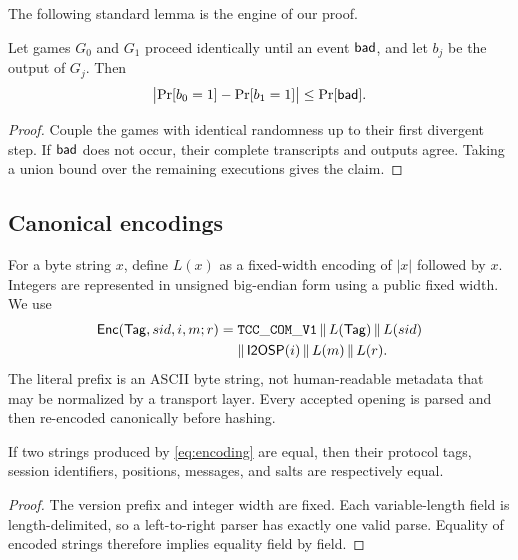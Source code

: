 The following standard lemma is the engine of our proof.

\begin{lemma}
\label{lem:iub}
Let games $G_0$ and $G_1$ proceed identically until an event $\mathsf{bad}$, and let
$b_j$ be the output of $G_j$.  Then
\[
  \bigl|\Pr[b_0=1]-\Pr[b_1=1]\bigr|
  \leq \Pr[\mathsf{bad}].
\]
\end{lemma}

\begin{proof}
Couple the games with identical randomness up to their first divergent step.
If $\mathsf{bad}$ does not occur, their complete transcripts and outputs agree.
Taking a union bound over the remaining executions gives the claim.
\end{proof}

\subsection{Canonical encodings}

For a byte string $x$, define $L(x)$ as a fixed-width encoding of $|x|$
followed by $x$.  Integers are represented in unsigned big-endian form using a
public fixed width.  We use
\begin{align}
 \Encode(\Tag,sid,i,m;r)
   ={}& \mathtt{TCC\char`_COM\char`_V1}\,\|\,L(\Tag)\,\|\,L(sid) \notag\\
      &{}\|\,\mathsf{I2OSP}(i)\,\|\,L(m)\,\|\,L(r).
  \label{eq:encoding}
\end{align}
The literal prefix is an ASCII byte string, not human-readable metadata that
may be normalized by a transport layer.  Every accepted opening is parsed and
then re-encoded canonically before hashing.

\begin{lemma}
\label{lem:context-separation}
If two strings produced by \cref{eq:encoding} are equal, then their protocol
tags, session identifiers, positions, messages, and salts are respectively
equal.
\end{lemma}

\begin{proof}
The version prefix and integer width are fixed.  Each variable-length field is
length-delimited, so a left-to-right parser has exactly one valid parse.
Equality of encoded strings therefore implies equality field by field.
\end{proof}
